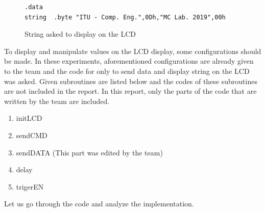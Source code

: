 \documentclass[pdftex,12pt,a4paper]{article}
\begin{document}
\begin{figure}[H]
    \centering
    \begin{lstlisting}[language={[x86masm]Assembler}]
	.data
string 	.byte "ITU - Comp. Eng.",0Dh,"MC Lab. 2019",00h
    \end{lstlisting}
    \label{code:lcd-array}
    \caption{String asked to display on the LCD}
\end{figure}

To display and manipulate values on the LCD display, some configurations should be made. In these experiments, aforementioned configurations are already given to the team and the code for only to send data and display string on the LCD was asked. Given subroutines are listed below and the codes of these subroutines are not included in the report. In this report, only the parts of the code that are written by the team are included.

\begin{enumerate}
    \item initLCD
    \item sendCMD
    \item sendDATA (This part was edited by the team)
    \item delay
    \item trigerEN
\end{enumerate}

Let us go through the code and analyze the implementation.
\end{document}
